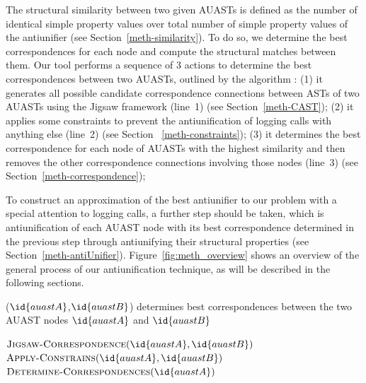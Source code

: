 The structural similarity between two given AUASTs is defined as the number of identical simple property values over total number of simple property values of the antiunifier (see Section~\ref{meth-similarity}). To do so, we determine the best correspondences for each node and compute the structural matches between them. Our tool performs a sequence of 3 actions to determine the best correspondences between two AUASTs, outlined by the algorithm : (1) it generates all possible candidate correspondence connections between ASTs of two AUASTs using the Jigsaw framework (line~1) (see Section~\ref{meth-CAST}); (2) it applies some constraints to prevent the antiunification of logging calls with anything else (line~2) (see Section ~\ref{meth-constraints}); (3) it determines the best correspondence for each node of AUASTs with the highest similarity and then removes the other correspondence connections involving those nodes (line~3) (see Section~\ref{meth-correspondence});

To construct an approximation of the best antiunifier to our problem with a special attention to logging calls, a further step should be taken, which is antiunification of each AUAST node with its best correspondence determined in the previous step through antiunifying their structural properties (see Section~\ref{meth-antiUnifier}). Figure~\ref{fig:meth_overview} shows an overview of the general process of our antiunification technique, as will be described in the following sections.


\begin{algorithm}
\caption{($\id{auastA}$,$\id{auastB}$) determines best correspondences between the two AUAST nodes $\id{auastA}$ and $\id{auastB}$}
\label{overview}
\begin{algorithmic}[1]
\DetermineBest
   \State  $\func{Jigsaw-Correspondence}(\id{auastA},\id{auastB})$
   \State $\func{Apply-Constrains}(\id{auastA},\id{auastB})$
   \State $ \func{Determine-Correspondences}(\id{auastA})$
\end{algorithmic}
\end{algorithm}






